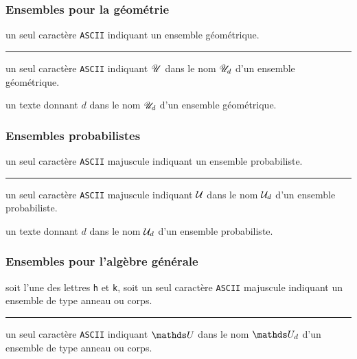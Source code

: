 \documentclass[12pt,a4paper]{article}
\theoremstyle{definition}
\newcommand\separation{
	\medskip
	\hfill\rule{0.5\textwidth}{0.75pt}\hfill
	\medskip
}
\newcommand\ascii{\texttt{ASCII}}
\begin{document}
\subsubsection{Ensembles pour la géométrie}


\IDarg{} un seul caractère \ascii{} indiquant un ensemble géométrique.


\separation



 un seul caractère \ascii{} indiquant $\setgeo{U}$ dans le nom $\setgeo*{U}{d}$ d'un ensemble géométrique.

 un texte donnant $d$ dans le nom $\setgeo*{U}{d}$ d'un ensemble géométrique.





\subsubsection{Ensembles probabilistes}


\IDarg{} un seul caractère \ascii{} majuscule indiquant un ensemble probabiliste.


\separation



 un seul caractère \ascii{} majuscule indiquant $\setproba{U}$ dans le nom $\setproba*{U}{d}$ d'un ensemble probabiliste.

 un texte donnant $d$ dans le nom $\setproba*{U}{d}$ d'un ensemble probabiliste.





\subsubsection{Ensembles pour l'algèbre générale}


\IDarg{} soit l'une des lettres  \texttt{h} et \texttt{k}, soit un seul caractère \ascii{} majuscule indiquant un ensemble de type anneau ou corps.


\separation



 un seul caractère \ascii{} indiquant $\setalge{U}$ dans le nom $\setalge*{U}{d}$ d'un ensemble de type anneau ou corps.
\end{document}
